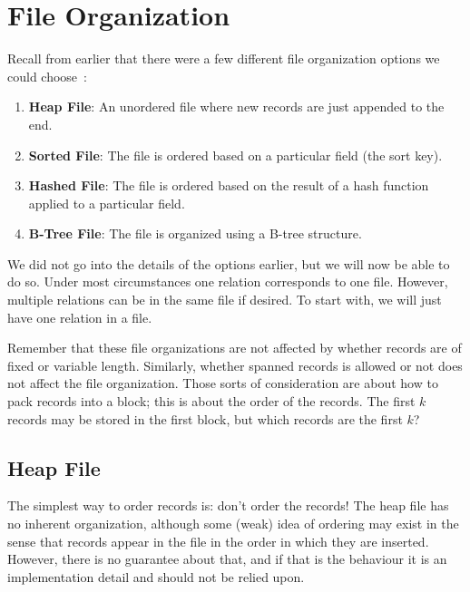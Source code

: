 




\section*{File Organization}

Recall from earlier that there were a few different file organization options we could choose~\cite{fds}:

\begin{enumerate}
	\item \textbf{Heap File}: An unordered file where new records are just appended to the end.
	\item \textbf{Sorted File}: The file is ordered based on a particular field (the sort key).
	\item \textbf{Hashed File}: The file is ordered based on the result of a hash function applied to a particular field.
	\item \textbf{B-Tree File}: The file is organized using a B-tree structure.
\end{enumerate}

We did not go into the details of the options earlier, but we will now be able to do so. Under most circumstances one relation corresponds to one file. However, multiple relations can be in the same file if desired. To start with, we will just have one relation in a file. 

Remember that these file organizations are not affected by whether records are of fixed or variable length. Similarly, whether spanned records is allowed or not does not affect the file organization. Those sorts of consideration are about how to pack records into a block; this is about the order of the records. The first $k$ records may be stored in the first block, but which records are the first $k$?

\subsection*{Heap File} 

The simplest way to order records is: don't order the records! The heap file has no inherent organization, although some (weak) idea of ordering may exist in the sense that records appear in the file in the order in which they are inserted. However, there is no guarantee about that, and if that is the behaviour it is an implementation detail and should not be relied upon. 

